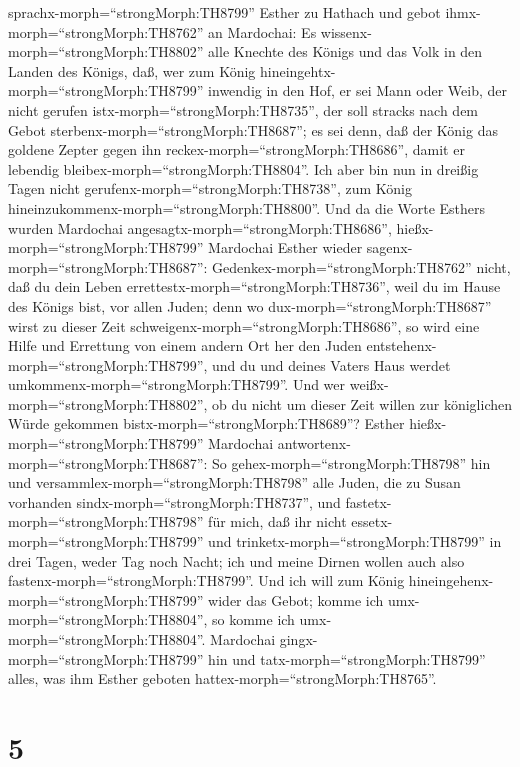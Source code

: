  sprachx-morph=``strongMorph:TH8799'' Esther zu Hathach und
gebot ihmx-morph=``strongMorph:TH8762'' an Mardochai:  Es
wissenx-morph=``strongMorph:TH8802'' alle Knechte des Königs und das
Volk in den Landen des Königs, daß, wer zum König
hineingehtx-morph=``strongMorph:TH8799'' inwendig in den Hof, er sei
Mann oder Weib, der nicht gerufen istx-morph=``strongMorph:TH8735'', der
soll stracks nach dem Gebot sterbenx-morph=``strongMorph:TH8687''; es
sei denn, daß der König das goldene Zepter gegen ihn
reckex-morph=``strongMorph:TH8686'', damit er lebendig
bleibex-morph=``strongMorph:TH8804''. Ich aber bin nun in dreißig Tagen
nicht gerufenx-morph=``strongMorph:TH8738'', zum König
hineinzukommenx-morph=``strongMorph:TH8800''.  Und da die
Worte Esthers wurden Mardochai angesagtx-morph=``strongMorph:TH8686'',
 hießx-morph=``strongMorph:TH8799'' Mardochai Esther wieder
sagenx-morph=``strongMorph:TH8687'':
Gedenkex-morph=``strongMorph:TH8762'' nicht, daß du dein Leben
errettestx-morph=``strongMorph:TH8736'', weil du im Hause des Königs
bist, vor allen Juden;  denn wo
dux-morph=``strongMorph:TH8687'' wirst zu dieser Zeit
schweigenx-morph=``strongMorph:TH8686'', so wird eine Hilfe und
Errettung von einem andern Ort her den Juden
entstehenx-morph=``strongMorph:TH8799'', und du und deines Vaters Haus
werdet umkommenx-morph=``strongMorph:TH8799''. Und wer
weißx-morph=``strongMorph:TH8802'', ob du nicht um dieser Zeit willen
zur königlichen Würde gekommen bistx-morph=``strongMorph:TH8689''?
 Esther hießx-morph=``strongMorph:TH8799'' Mardochai
antwortenx-morph=``strongMorph:TH8687'':  So
gehex-morph=``strongMorph:TH8798'' hin und
versammlex-morph=``strongMorph:TH8798'' alle Juden, die zu Susan
vorhanden sindx-morph=``strongMorph:TH8737'', und
fastetx-morph=``strongMorph:TH8798'' für mich, daß ihr nicht
essetx-morph=``strongMorph:TH8799'' und
trinketx-morph=``strongMorph:TH8799'' in drei Tagen, weder Tag noch
Nacht; ich und meine Dirnen wollen auch also
fastenx-morph=``strongMorph:TH8799''. Und ich will zum König
hineingehenx-morph=``strongMorph:TH8799'' wider das Gebot; komme ich
umx-morph=``strongMorph:TH8804'', so komme ich
umx-morph=``strongMorph:TH8804''.  Mardochai
gingx-morph=``strongMorph:TH8799'' hin und
tatx-morph=``strongMorph:TH8799'' alles, was ihm Esther geboten
hattex-morph=``strongMorph:TH8765''.

\hypertarget{section-4}{%
\section{5}\label{section-4}}


